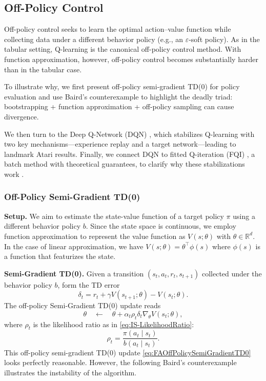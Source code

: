\documentclass[
]{book}
\theoremstyle{definition}
\theoremstyle{definition}
\theoremstyle{definition}
\theoremstyle{definition}
\theoremstyle{remark}
\begin{document}
\subsection{Off-Policy Control}\label{off-policy-control-1}

Off-policy control seeks to learn the optimal action--value function while collecting data under a different behavior policy (e.g., an \(\varepsilon\)-soft policy). As in the tabular setting, Q-learning is the canonical off-policy control method. With function approximation, however, off-policy control becomes substantially harder than in the tabular case.

To illustrate why, we first present off-policy semi-gradient TD(0) for policy evaluation and use Baird's counterexample \citep{baird1995residual} to highlight the deadly triad: bootstrapping + function approximation + off-policy sampling can cause divergence.

We then turn to the Deep Q-Network (DQN) \citep{mnih2015human}, which stabilizes Q-learning with two key mechanisms---experience replay and a target network---leading to landmark Atari results. Finally, we connect DQN to fitted Q-iteration (FQI) \citep{riedmiller2005neural}, a batch method with theoretical guarantees, to clarify why these stabilizations work \citep{fan2020theoretical}.

\subsubsection{Off-Policy Semi-Gradient TD(0)}\label{off-policy-semi-gradient-td0}

\textbf{Setup.} We aim to estimate the state-value function of a target policy \(\pi\) using a different behavior policy \(b\). Since the state space is continuous, we employ function approximation to represent the value function as \(V(s;\theta)\) with \(\theta \in \mathbb{R}^d\). In the case of linear approximation, we have \(V(s;\theta) = \theta^\top \phi(s)\) where \(\phi(s)\) is a function that featurizes the state.

\textbf{Semi-Gradient TD(0).} Given a transition \((s_t,a_t,r_t,s_{t+1})\) collected under the behavior policy \(b\), form the TD error
\[
\delta_t = r_t + \gamma V(s_{t+1}; \theta) - V(s_t;\theta).
\]
The off-policy Semi-Gradient TD(0) update reads
\begin{equation}
\theta \quad \leftarrow \quad \theta + \alpha_t \rho_t \delta_t \nabla_\theta V(s_t; \theta),
\label{eq:FAOffPolicySemiGradientTD0}
\end{equation}
where \(\rho_t\) is the likelihood ratio as in \eqref{eq:IS-LikelihoodRatio}:
\[
\rho_t = \frac{\pi(a_t \mid s_t)}{b(a_t \mid s_t)}.
\]
This off-policy semi-gradient TD(0) update \eqref{eq:FAOffPolicySemiGradientTD0} looks perfectly reasonable. However, the following Baird's counterexample illustrates the instability of the algorithm.
\end{document}
